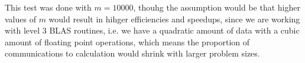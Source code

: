 \documentclass{scrartcl}
\begin{document}
This test was done with $m=10000$, thouhg the assumption would be that higher values of $m$ would result in hihger efficiencies and speedups, since we are working with level 3 BLAS routines, i.e. we have a quadratic amount of data with a cubic amount of floating point operations, which means the proportion of communications to calculation would shrink with larger problem sizes.
\end{document}
